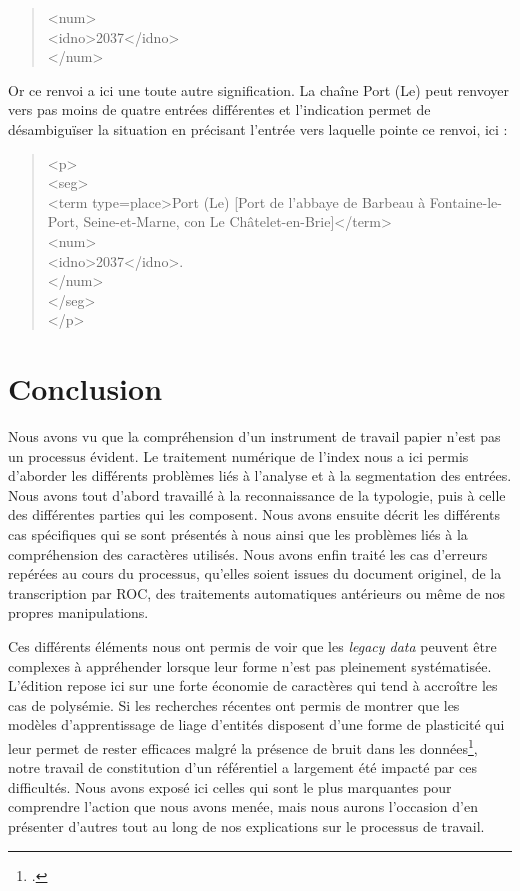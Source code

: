 \documentclass[a4paper,12pt,twoside]{book}
\begin{document}
	\begin{quotation}
		<num>\\
		\indent{}2037</idno>\\
	\end{quotation}

	\noindent Or ce renvoi a ici une toute autre signification. La chaîne \og Port (Le)\fg{} peut renvoyer vers pas moins de quatre entrées différentes et l'indication \og [2037]\fg{} permet de désambiguïser la situation en précisant l'entrée vers laquelle pointe ce renvoi, ici :
	
	\begin{quotation}
            <p>\\
				\indent{}\\
				\indent\indent\indent<term type=\textquotesingle place\textquotesingle >Port (Le) [Port de l'abbaye de Barbeau à Fontaine-le-Port,
				Seine-et-Marne, con Le Châtelet-en-Brie]</term>\\
				\indent\indent{}\\
				\indent\indent\indent\indent<idno>2037</idno>.\\
				\indent\indent\indent</num>\\
				\indent\indent</seg>\\
				\indent</p>
	\end{quotation}
	
	\section*{Conclusion}
	
	Nous avons vu que la compréhension d'un instrument de travail papier n'est pas un processus évident. Le traitement numérique de l'index nous a ici permis d'aborder les différents problèmes liés à l'analyse et à la segmentation des entrées. Nous avons tout d'abord travaillé à la reconnaissance de la typologie, puis à celle des différentes parties qui les composent. Nous avons ensuite décrit les différents cas spécifiques qui se sont présentés à nous ainsi que les problèmes liés à la compréhension des caractères utilisés. Nous avons enfin traité les cas d'erreurs repérées au cours du processus, qu'elles soient issues du document originel, de la transcription par ROC, des traitements automatiques antérieurs ou même de nos propres manipulations.
	
	Ces différents éléments nous ont permis de voir que les \textit{legacy data} peuvent être complexes à appréhender lorsque leur forme n'est pas pleinement systématisée. L'édition repose ici sur une forte économie de caractères qui tend à accroître les cas de polysémie. Si les recherches récentes ont permis de montrer que les modèles d'apprentissage de liage d'entités disposent d'une forme de plasticité qui leur permet de rester efficaces malgré la présence de bruit dans les données\footcite{linhares_pontes_impact_2019, koudoro-parfait_reconnaissance_2022}, notre travail de constitution d'un référentiel a largement été impacté par ces difficultés. Nous avons exposé ici celles qui sont le plus marquantes pour comprendre l'action que nous avons menée, mais nous aurons l'occasion d'en présenter d'autres tout au long de nos explications sur le processus de travail.
	
\end{document}

